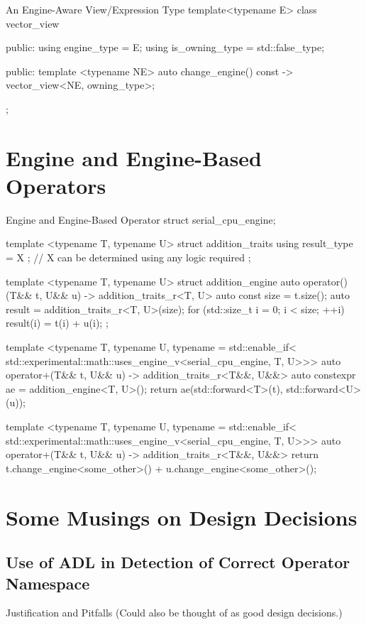 \documentclass[oneside,11pt,a4paper]{jbarticle}
\begin{document}
\begin{codecpp}{An Engine-Aware View/Expression Type}
  template<typename E>
  class vector_view {
  public:
    using engine_type = E;
    using is_owning_type = std::false_type;

  public:
    template <typename NE>
    auto change_engine() const -> vector_view<NE, owning_type>;
  };
\end{codecpp}

\section{Engine and Engine-Based Operators}

\begin{codecpp}{Engine and Engine-Based Operator}
struct serial_cpu_engine;

template <typename T, typename U>
struct addition_traits {
  using result_type = X ; // X can be determined using any logic required
};

template <typename T, typename U>
struct addition_engine {
  auto operator()(T&& t, U&& u) -> addition_traits_r<T, U>
  {
    auto const size = t.size();
    auto result = addition_traits_r<T, U>(size);
    for (std::size_t i = 0; i < size; ++i) {
      result(i) = t(i) + u(i);
    }
  }
};

template <typename T,
          typename U,
          typename = std::enable_if<
            std::experimental::math::uses_engine_v<serial_cpu_engine, T, U>>>
auto operator+(T&& t, U&& u) -> addition_traits_r<T&&, U&&>
{
  auto constexpr ae = addition_engine<T, U>();
  return ae(std::forward<T>(t), std::forward<U>(u));
}

template <typename T,
          typename U,
          typename = std::enable_if<
            std::experimental::math::uses_engine_v<serial_cpu_engine, T, U>>>
auto operator+(T&& t, U&& u) -> addition_traits_r<T&&, U&&>
{
  return t.change_engine<some_other>() + u.change_engine<some_other>();
}

\end{codecpp}
\section{Some Musings on Design Decisions}
\subsection{Use of ADL in Detection of Correct Operator Namespace}
Justification and Pitfalls (Could also be thought of as good design decisions.)
\end{document}
